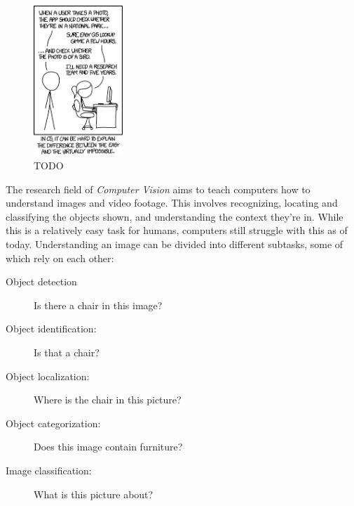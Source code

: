 \documentclass[twoside,a4paper]{article}
\begin{document}
\begin{figure}[h!]
\centering
    \includegraphics[width=0.3\textwidth]{images/xkcd}
\caption{TODO}
\label{fig:xkcd}
\end{figure}



The research field of \emph{Computer Vision} aims to teach computers how to understand images and video footage. This involves recognizing, locating and classifying the objects shown, and understanding the context they're in.
While this is a relatively easy task for humans, computers still struggle with this as of today. Understanding an image can be divided into different subtasks, some of which rely on each other:
\begin{description}
\item[Object detection] Is there a chair in this image?
\item[Object identification:] Is that a chair?
\item[Object localization:] Where is the chair in this picture?
\item[Object categorization:] Does this image contain furniture?
\item[Image classification:] What is this picture about?
\end{description}
\end{document}
